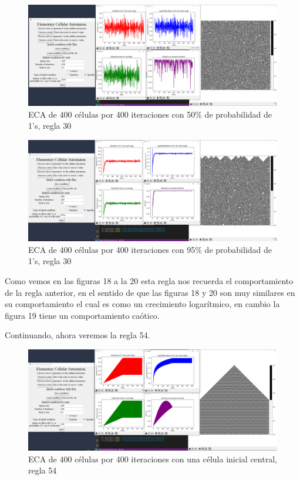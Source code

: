 \documentclass[11pt]{article}
\begin{document}
		\begin{figure}[H]
			\centering
			\includegraphics[scale=0.26]{resources/add8.png}
			\caption{ECA de 400 células por 400 iteraciones con 50\% de probabilidad de 1's, regla 30}								\label{fig:picture}
		\end{figure}
		\begin{figure}[H]
			\centering
			\includegraphics[scale=0.26]{resources/add9.png}
			\caption{ECA de 400 células por 400 iteraciones con 95\% de probabilidad de 1's, regla 30}								\label{fig:picture}
		\end{figure}
		Como vemos en las figuras 18 a la 20 esta regla nos recuerda el comportamiento de la regla anterior, en el sentido de que las figuras 18 y 20 son muy similares en su comportamiento el cual es como un crecimiento logarítmico, en cambio la figura 19 tiene un comportamiento caótico.\par
		Continuando, ahora veremos la regla 54.
		\begin{figure}[H]
			\centering
			\includegraphics[scale=0.26]{resources/add10.png}
			\caption{ECA de 400 células por 400 iteraciones con una célula inicial central, regla 54}								\label{fig:picture}
		\end{figure}
\end{document}
